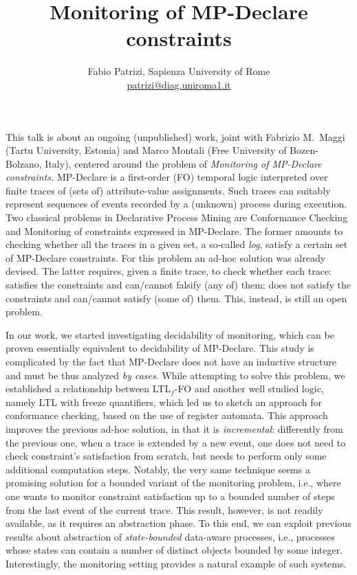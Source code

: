 \documentclass[12pt]{article}
\title{Monitoring of MP-Declare constraints}
\author{Fabio Patrizi, Sapienza University of Rome\\
\url{patrizi@diag.uniroma1.it}
}
\date{}
\begin{document}
\maketitle

This talk is about an ongoing (unpublished) work, joint with 
Fabrizio M.~Maggi (Tartu University, Estonia) 
and Marco Montali (Free University of Bozen-Bolzano, Italy),
centered around the problem of 
\emph{Monitoring of MP-Declare constraints.}
MP-Declare is a first-order (FO) temporal logic interpreted over finite traces 
of (sets of) attribute-value assignments. Such traces can suitably represent
sequences of events recorded by a (unknown) process during execution. 
Two classical problems in Declarative Process Mining are 
Conformance Checking and Monitoring of constraints expressed in 
MP-Declare. The former amounts to checking whether all the traces in a given
set, a so-called \emph{log}, satisfy a certain set of MP-Declare 
constraints. For this problem an ad-hoc solution was already devised. 
The latter requires, given a finite trace, to check whether 
each trace: satisfies the constraints and can/cannot falsify (any of) them;
does not satisfy the constraints and can/cannot satisfy (some of) them.
This, instead, is still an open problem.

In our work, we started investigating decidability of monitoring, 
which can be proven essentially
equivalent to decidability of MP-Declare. 
This study is complicated by the fact that 
MP-Declare does not have an inductive structure and must be thus 
analyzed \emph{by cases}.
While attempting to solve this problem, we established a relationship
between LTL$_f$-FO and another well studied logic, 
namely LTL with freeze quantifiers, which led us to sketch
an approach for conformance checking, based on the use
of register automata. This approach improves the previous ad-hoc solution, 
in that it is \emph{incremental}: differently from the previous one,
when a trace is extended by a new event, one does not need to check 
constraint's satisfaction from scratch, but needs to perform only some additional
computation steps.
Notably, the very same technique seems a promising solution 
for a bounded variant of the monitoring problem, i.e., where one 
wants to monitor constraint satisfaction up to a bounded number of 
steps from the last event of the current trace. This result, however, 
is not readily available, as it requires an abstraction phase. To this end,
we can exploit previous results about abstraction of 
\emph{state-bounded} data-aware processes, i.e., processes whose 
states can contain a number of distinct objects bounded by some integer.
Interestingly, the monitoring setting provides a natural example of 
such systems.
\end{document}
